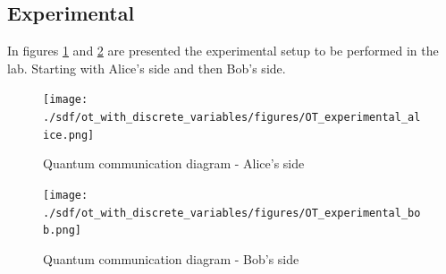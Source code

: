 \subsection{Experimental}
In figures \ref{quantumchannelcommunication1} and \ref{quantumchannelcommunication2} are presented the experimental setup to be performed in the lab. Starting with Alice's side and then Bob's side.

\begin{figure}[H]
	\centering \texttt{[image: ./sdf/ot\_with\_discrete\_variables/figures/OT\_experimental\_alice.png]}
	\caption{Quantum communication diagram - Alice's side}\label{quantumchannelcommunication1}
\end{figure}

\begin{figure}[H]
	\centering \texttt{[image: ./sdf/ot\_with\_discrete\_variables/figures/OT\_experimental\_bob.png]}
	\caption{Quantum communication diagram - Bob's side}\label{quantumchannelcommunication2}
\end{figure}




